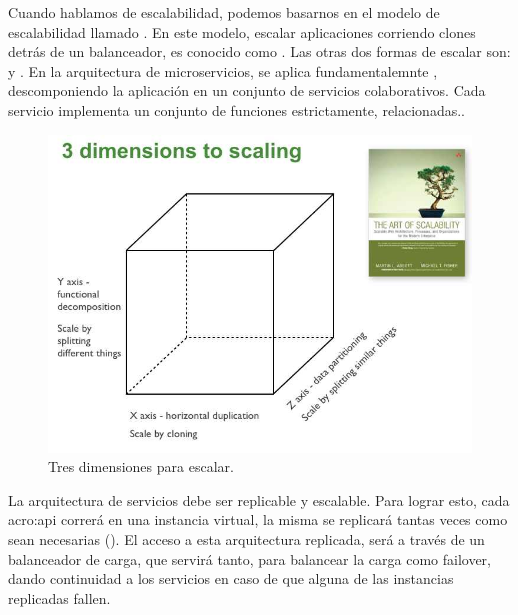 
Cuando hablamos de escalabilidad, podemos basarnos en el modelo de escalabilidad llamado .
En este modelo, escalar aplicaciones corriendo clones detrás de un balanceador, es conocido como .  Las otras dos formas de escalar son:  y .
En la arquitectura de microservicios, se aplica fundamentalemnte , descomponiendo la aplicación en un conjunto de servicios colaborativos.  Cada servicio implementa un conjunto de funciones estrictamente, relacionadas.\cite{website:akfpartners-scale-cube}.

\begin{figure}
  \includegraphics[width=\linewidth]{src/images/03-capitulo-3/scale_cube.jpg}
  \caption{Tres dimensiones para escalar.}
  \label{fig:scale-cube}
\end{figure}

La arquitectura de servicios debe ser replicable y escalable.  Para lograr esto, cada \gls{acro:api} correrá en una instancia virtual, la misma se replicará tantas veces como sean necesarias ().  El acceso a esta arquitectura replicada, será a través de un balanceador de carga, que servirá tanto, para balancear la carga como failover, dando continuidad a los servicios en caso de que alguna de las instancias replicadas fallen.

